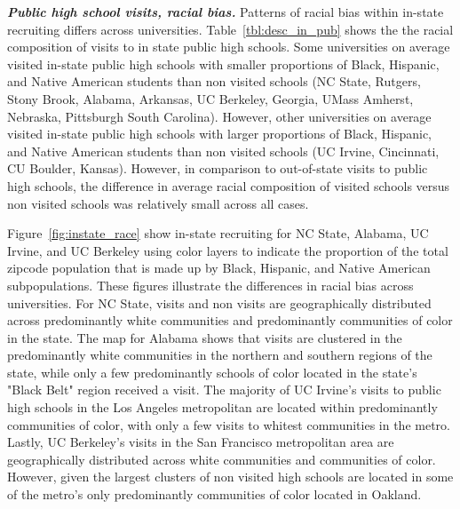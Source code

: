 \documentclass[twoside]{article}
\begin{document}

\textbf{\textit{Public high school visits, racial bias.}} Patterns of racial bias within in-state recruiting differs across universities. Table~\ref{tbl:desc_in_pub} shows the the racial composition of visits to in state public high schools. Some universities on average visited in-state public high schools with smaller proportions of Black, Hispanic, and Native American students than non visited schools (NC State, Rutgers, Stony Brook, Alabama, Arkansas, UC Berkeley, Georgia, UMass Amherst, Nebraska, Pittsburgh South Carolina). However, other universities on average visited in-state public high schools with larger proportions of Black,  Hispanic, and Native American students than non visited schools (UC Irvine, Cincinnati, CU Boulder, Kansas). However, in comparison to out-of-state visits to public high schools, the difference in average racial composition of visited schools versus non visited schools was relatively small across all cases.

Figure~\ref{fig:instate_race} show in-state recruiting for NC State, Alabama, UC Irvine, and UC Berkeley using color layers to indicate the proportion of the total zipcode population that is made up by Black, Hispanic, and Native American subpopulations. These figures illustrate the differences in racial bias across universities. For NC State, visits and non visits are geographically distributed across predominantly white communities and predominantly communities of color in the state. The map for Alabama shows that visits are clustered in the predominantly white communities in the northern and southern regions of the state, while only a few predominantly schools of color located in the state's "Black Belt" region received a visit. The majority of UC Irvine's visits to public high schools in the Los Angeles metropolitan are located within predominantly communities of color, with only a few visits to whitest communities in the metro. Lastly, UC Berkeley's visits in the San Francisco metropolitan area are geographically distributed across white communities and communities of color. However, given  the largest clusters of non visited high schools are located in some of the metro's only predominantly communities of color located in Oakland.
\end{document}
